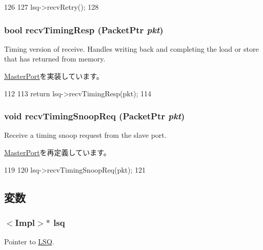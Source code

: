 \begin{DoxyCode}
126 {
127     lsq->recvRetry();
128 }
\end{DoxyCode}
\hypertarget{classFullO3CPU_1_1DcachePort_a482dba5588f4bee43e498875a61e5e0b}{
\subsubsection[{recvTimingResp}]{\setlength{\rightskip}{0pt plus 5cm}bool recvTimingResp ({\bf PacketPtr} {\em pkt})}}
\label{classFullO3CPU_1_1DcachePort_a482dba5588f4bee43e498875a61e5e0b}
Timing version of receive. Handles writing back and completing the load or store that has returned from memory. 

\hyperlink{classMasterPort_abd323548d6c93f8b0543f1fe3a86ca35}{MasterPort}を実装しています。


\begin{DoxyCode}
112 {
113     return lsq->recvTimingResp(pkt);
114 }
\end{DoxyCode}
\hypertarget{classFullO3CPU_1_1DcachePort_aff3031c56fc4947a19695c868bb8233e}{
\subsubsection[{recvTimingSnoopReq}]{\setlength{\rightskip}{0pt plus 5cm}void recvTimingSnoopReq ({\bf PacketPtr} {\em pkt})}}
\label{classFullO3CPU_1_1DcachePort_aff3031c56fc4947a19695c868bb8233e}
Receive a timing snoop request from the slave port. 

\hyperlink{classMasterPort_ae43c73eff109f907118829fcfa9e7096}{MasterPort}を再定義しています。


\begin{DoxyCode}
119 {
120     lsq->recvTimingSnoopReq(pkt);
121 }
\end{DoxyCode}


\subsection{変数}
\hypertarget{classFullO3CPU_1_1DcachePort_a031bbb555122076457987d89d34e8711}{
\subsubsection[{lsq}]{$<$Impl$>$$\ast$ {\bf lsq}}}
\label{classFullO3CPU_1_1DcachePort_a031bbb555122076457987d89d34e8711}
Pointer to \hyperlink{classLSQ}{LSQ}. 

